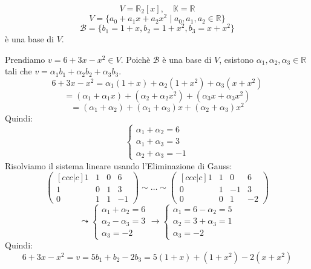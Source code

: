 \documentclass[a4paper]{article}
\theoremstyle{break}
\theoremstyle{break}
\theoremstyle{break}
\theoremstyle{break}
\begin{document}
\begin{example}
  \[
    V = \mathbb{R}_2[x], \quad \mathbb{K} = \mathbb{R}
  \] 
  \[
  V = \{a_0 + a_1x + a_2x^2 \;|\; a_0, a_1, a_2 \in \mathbb{R}\}
  \] 
  \[
  \mathcal{B} = \{b_1 = 1+x, b_2 = 1+x^2, b_3 = x + x^2\} 
  \] 
  è una base di \( V \).

  \vspace{1em}
  \noindent Prendiamo \( v = 6 + 3x - x^2 \in V\). Poichè \( \mathcal{B} \) è una base di
  \( V \), esistono \( \alpha_1, \alpha_2, \alpha_3 \in \mathbb{R} \) tali che
  \( v = \alpha_1 b_1 + \alpha_2 b_2 + \alpha_3 b_3 \).
  \[
  6 + 3x - x^2 = \alpha_1(1+x) + \alpha_2(1+x^2) + \alpha_3(x+x^2)
  \] 
  \[
  = (\alpha_1 + \alpha_1 x) + (\alpha_2 + \alpha_2 x^2) + (\alpha_3 x + \alpha_3 x^2)
  \] 
  \[
  = (\alpha_1 + \alpha_2) + (\alpha_1 + \alpha_3)x + (\alpha_2 + \alpha_3)x^2
  \] 
  Quindi:
  \[
  \begin{cases}
    \alpha_1 + \alpha_2 = 6 \\
    \alpha_1 + \alpha_3 = 3 \\
    \alpha_2 + \alpha_3 = -1
  \end{cases}
  \] 
  Risolviamo il sistema lineare usando l'Eliminazione di Gauss:
  \[
    \begin{pmatrix}[ccc|c]
      1 & 1 & 0 & 6\\
      1 & 0 & 1 & 3\\
      0 & 1 & 1 & -1
  \end{pmatrix} 
  \sim
  \ldots
  \sim
  \begin{pmatrix}[ccc|c]
    1 & 1 & 0 & 6\\
    0 & 1 & -1 & 3\\
    0 & 0 & 1 & -2
  \end{pmatrix} 
  \] 
  \[
  \leadsto \begin{cases}
    \alpha_1 + \alpha_2 = 6\\
    \alpha_2 - \alpha_3 = 3\\
    \alpha_3 = -2
  \end{cases}
  \to
  \begin{cases}
    \alpha_1 = 6-\alpha_2 = 5\\
    \alpha_2 = 3 + \alpha_3 = 1\\
    \alpha_3 = -2
  \end{cases}
  \] 
  Quindi:
  \[
  6 + 3x - x^2 = v = 5b_1 + b_2 - 2b_3 = 5(1+x) + (1+x^2) - 2(x+x^2)
  \] 
\end{example}
\end{document}
